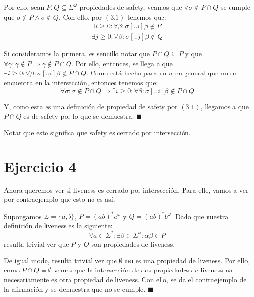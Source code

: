 \documentclass{article}
\begin{document}
Por ello, sean $P, Q \subseteq \Sigma^\omega$ propiedades de safety, veamos que $\forall \sigma \notin P \cap Q$ se cumple que $\sigma \notin P \land \sigma \notin Q$.
Con ello, por $(3.1)$ tenemos que:
\begin{equation*}
	\begin{aligned}
		\exists i \geq 0 : \forall \beta : \sigma[..i]\beta \notin P \\
		\exists j \geq 0 : \forall \beta : \sigma[..j]\beta \notin Q
	\end{aligned}
\end{equation*}

Si consideramos la primera, es sencillo notar que $P \cap Q \subseteq P$ y que $\forall \gamma : \gamma \notin P \Rightarrow \gamma \notin P \cap Q$.
Por ello, entonces, se llega a que $\exists i \geq 0 : \forall \beta : \sigma[..i]\beta \notin P \cap Q$.
Como está hecho para un $\sigma$ en general que no se encuentra en la intersección, entonces tenemos que:
\begin{equation*}
	\forall \sigma : \sigma \notin P \cap Q \Rightarrow \exists i \geq 0 : \forall \beta : \sigma[..i]\beta \notin P \cap Q
\end{equation*}

Y, como esta es una definición de propiedad de safety por $(3.1)$, llegamos a que $P \cap Q$ es de safety por lo que se demuestra. $\blacksquare$

Notar que esto significa que safety es cerrado por intersección.

\section*{Ejercicio 4}
Ahora queremos ver si liveness es cerrado por intersección.
Para ello, vamos a ver por contraejemplo que esto no es así.

Supongamos $\Sigma = \{a, b\}$, $P = (ab)^* a^\omega$ y $Q = (ab)^* b^\omega$.
Dado que nuestra definición de liveness es la siguiente:
\begin{equation}
	\tag{4.1}
	\forall a \in \Sigma^* : \exists \beta \in \Sigma^\omega : \alpha\beta \in P
\end{equation}
resulta trivial ver que $P$ y $Q$ son propiedades de liveness.

De igual modo, resulta trivial ver que $\emptyset$ \textbf{no} es una propiedad de liveness.
Por ello, como $P \cap Q = \emptyset$ vemos que la intersección de dos propiedades de liveness no necesariamente es otra propiedad de liveness.
Con ello, se da el contraejemplo de la afirmación y se demuestra que no se cumple. $\blacksquare$
\end{document}
